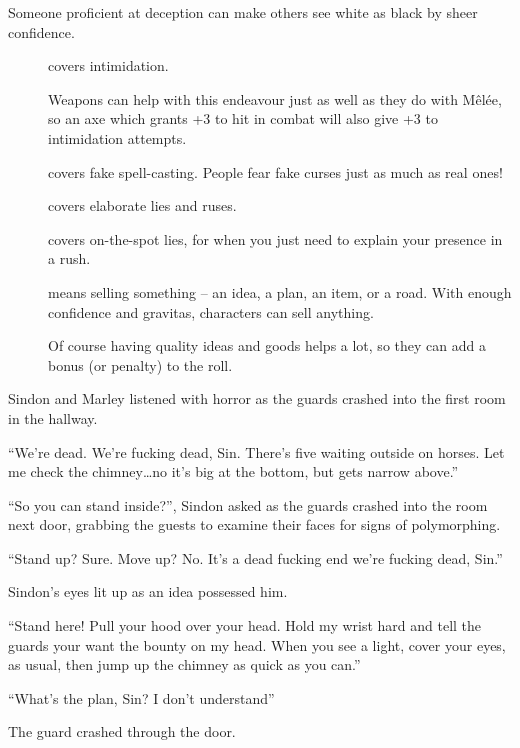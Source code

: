 \begin{multicols}{2}
Someone proficient at deception can make others see white as black by sheer confidence.

\begin{description}
  \item[]
    covers intimidation.

    Weapons can help with this endeavour just as well as they do with M\^{e}l\'ee, so an axe which grants +3 to hit in combat will also give +3 to intimidation attempts.
  \item[]
    covers fake spell-casting.
    People fear fake curses just as much as real ones!
  \item[]
    covers elaborate lies and ruses.
  \item[]
    covers on-the-spot lies, for when you just need to explain your presence in a rush.
  \item[]
    means selling something -- an idea, a plan, an item, or a road.
    With enough confidence and gravitas, characters can sell anything.

    Of course having quality ideas and goods helps a lot, so they can add a bonus (or penalty) to the roll.
\end{description}


\begin{exampletext}
  Sindon and Marley listened with horror as the guards crashed into the first room in the hallway.

  ``We're dead.
  We're fucking dead, Sin.
  There's five waiting outside on horses.
  Let me check the chimney\ldots no it's big at the bottom, but gets narrow above.''

  ``So you can stand inside?'', Sindon asked as the guards crashed into the room next door, grabbing the guests to examine their faces for signs of polymorphing.

  ``Stand up?
  Sure.
  Move up?
  No.
  It's a dead fucking end we're fucking dead, Sin.''

  Sindon's eyes lit up as an idea possessed him.

  ``Stand here!
  Pull your hood over your head.
  Hold my wrist hard and tell the guards your want the bounty on my head.
  When you see a light, cover your eyes, as usual, then jump up the chimney as quick as you can.''

  ``What's the plan, Sin?
  I don't understand''

  The guard crashed through the door.


\end{exampletext}
\end{multicols}

